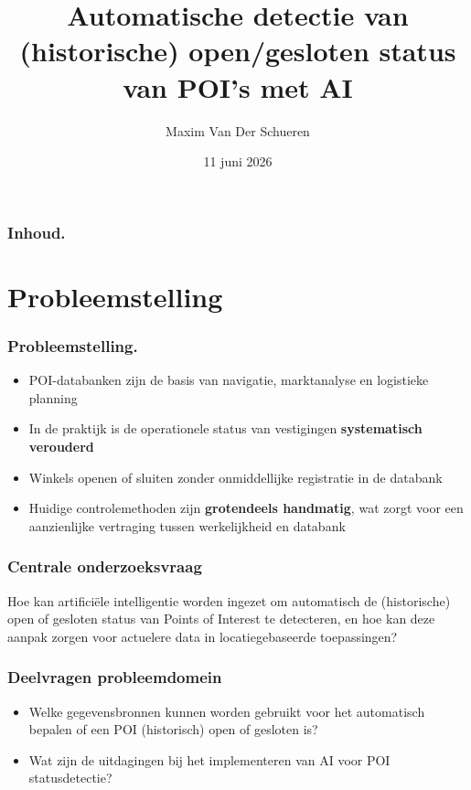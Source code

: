\documentclass[aspectratio=169]{beamer}
\title{Automatische detectie van (historische) open/gesloten status van POI's met AI}
\author{Maxim Van Der Schueren}
\date{11 juni 2026}
\begin{document}
    
    \begin{frame}
        \maketitle
    \end{frame}
    
    \begin{frame}
        \frametitle{Inhoud.}
        \tableofcontents
    \end{frame}
    
    \section{Probleemstelling}
    
    \begin{frame}
        \frametitle{Probleemstelling.}
        
        \begin{itemize}
            \item POI-databanken zijn de basis van navigatie, marktanalyse en logistieke planning
            \item In de praktijk is de operationele status van vestigingen \textbf{systematisch verouderd}
            \item Winkels openen of sluiten zonder onmiddellijke registratie in de databank
            \item Huidige controlemethoden zijn \textbf{grotendeels handmatig}, wat zorgt voor een aanzienlijke vertraging tussen werkelijkheid en databank
        \end{itemize}
        
    \end{frame}
    
    \begin{frame}
        \frametitle{Centrale onderzoeksvraag}
        
            Hoe kan artificiële intelligentie worden ingezet om automatisch de (historische) open of gesloten status van Points of Interest te detecteren, en hoe kan deze aanpak zorgen voor actuelere data in locatiegebaseerde toepassingen?
        
    \end{frame}
    
    \begin{frame}
        \frametitle{Deelvragen probleemdomein}
        
        \begin{itemize}
            \item Welke gegevensbronnen kunnen worden gebruikt voor het automatisch bepalen of een POI (historisch) open of gesloten is?
            \item Wat zijn de uitdagingen bij het implementeren van AI voor POI statusdetectie?
        \end{itemize}
        
    \end{frame}
    
\end{document}
